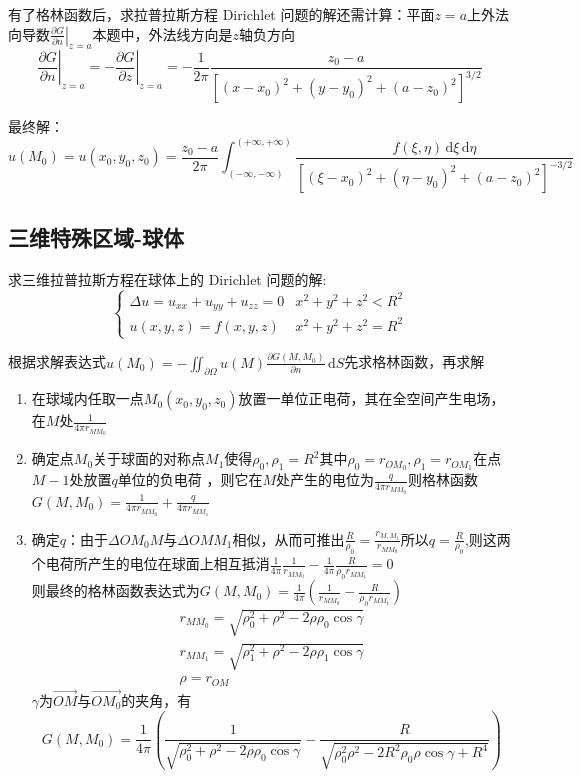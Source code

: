有了格林函数后，求拉普拉斯方程 Dirichlet 问题的解还需计算：平面\(z=a\)上外法向导数\(\left.\frac{\partial G}{\partial n}\right|_{z=a}\)本题中，外法线方向是\(z\)轴负方向
\[
\left.\frac{\partial G}{\partial n}\right|_{z=a}=-\left.\frac{\partial G}{\partial z}\right|_{z=a}=-\frac{1}{2\pi}\frac{z_0-a}{[(x-x_0)^2+(y-y_0)^2+(a-z_0)^2]^{3/2}}
\]

最终解：
\[
u(M_0)=u(x_0,y_0,z_0)=\frac{z_0-a}{2\pi}\int_{(-\infty,-\infty)}^{(+\infty,+\infty)}\frac{f(\xi,\eta)\,\mathrm{d}\xi\,\mathrm{d}\eta}{[(\xi-x_0)^2+(\eta-y_0)^2+(a-z_0)^2]^{-3/2}}
\]

\subsection{三维特殊区域-球体}

求三维拉普拉斯方程在球体上的 Dirichlet 问题的解:
\[\begin{cases}
\Delta u=u_{xx}+u_{yy}+u_{zz}=0&x^2+y^2+z^2<R^2\\
u(x,y,z)=f(x,y,z)&x^2+y^2+z^2=R^2
\end{cases}\]

根据求解表达式\(u(M_0)=-\iint_{\partial\Omega} u(M)\frac{\partial G(M,M_0)}{\partial n}\,\mathrm{d}S\)先求格林函数，再求解
\begin{enumerate}
	\item 在球域内任取一点\(M_0(x_0,y_0,z_0)\)放置一单位正电荷，其在全空间产生电场，在\(M\)处\(\frac{1}{4\pi  r_{MM_0}}\)
	\item 确定点\(M_0\)关于球面的对称点\(M_1\)使得\(\rho_0,\rho_1=R^2\)其中\(\rho_0=r_{OM_0},\rho_1=r_{OM_1}\)在点\(M-1\)处放置\(q\)单位的负电荷 ，则它在\(M\)处产生的电位为\(\frac{q}{4\pi  r_{MM_0}}\)则格林函数\(G(M,M_0)=\frac{1}{4\pi  r_{MM_0}}+\frac{q}{4\pi  r_{MM_1}}\)
	\item 确定\(q\)：由于\(\Delta OM_0M\)与\(\Delta OMM_1\)相似，从而可推出\(\frac{R}{\rho_0}=\frac{r_{M,M_1}}{r_{MM_0}}\)所以\(q=\frac{R}{\rho_0}\),则这两个电荷所产生的电位在球面上相互抵消\(\frac{1}{4\pi}\frac{1}{r_{MM_0}}-\frac{1}{4\pi}\frac{R}{\rho_0r_{MM_1}}=0\)\\
	则最终的格林函数表达式为\(G(M,M_0)=\frac{1}{4\pi}\left(\frac{1}{r_{MM_0}}-\frac{R}{\rho_0r_{MM_1}}\right)\)
	\begin{gather*}r_{MM_0}=\sqrt{\rho_0^2+\rho^2-2\rho\rho_0\cos\gamma}\\r_{MM_1}=\sqrt{\rho_1^2+\rho^2-2\rho\rho_1\cos\gamma}\\\rho=r_{OM}\end{gather*}
	\(\gamma\)为\(\overrightarrow{OM}\)与\(\overrightarrow{OM_0}\)的夹角，有
	\[G(M,M_0)=\frac{1}{4\pi}\left(\frac{1}{\sqrt{\rho_0^2+\rho^2-2\rho\rho_0\cos\gamma}}-\frac{R}{\sqrt{\rho_0^2\rho^2-2R^2\rho_0\rho\cos\gamma+R^4}}\right)\]
\end{enumerate}

